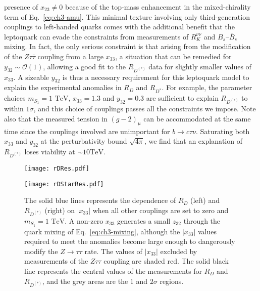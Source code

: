 presence of $x_{23} \neq 0$ because of the top-mass enhancement in the
mixed-chirality term of Eq.~\eqref{eq:ch3-amu}. This minimal texture involving only
third-generation couplings to left-handed quarks comes with the additional
benefit that the leptoquark can evade the constraints from measurements of
$R_K^{\nu\nu}$ and $B_s$--$\bar{B}_s$ mixing. In fact, the only serious
constraint is that arising from the modification of the $Z\tau\bar{\tau}$
coupling from a large $x_{33}$, a situation that can be remedied for $y_{32}
\sim \mathscr{O}(1)$, allowing a good fit to the $R_{D^{(*)}}$ data for slightly
smaller values of $x_{33}$. A sizeable $y_{32}$ is thus a necessary requirement
for this leptoquark model to explain the experimental anomalies in $R_D$ and
$R_{D^*}$. For example, the parameter choices $m_{S_{1}} = 1 \text{ TeV}$, $x_{33}
= 1.3$ and $y_{32} = 0.3$ are sufficient to explain $R_{D^{(*)}}$ to within
$1\sigma$, and this choice of couplings passes all the constraints we impose.
Note also that the measured tension in $(g-2)_\mu$ can be accommodated at the
same time since the couplings involved are unimportant for $b \to c \tau \nu$.
Saturating both $x_{33}$ and $y_{32}$ at the perturbativity bound $\sqrt{4\pi}$,
we find that an explanation of $R_{D^{(*)}}$ loses viability at $\sim 10 \text{
  TeV}$.

\begin{figure}[t]
  \centering
  \begin{minipage}[t]{0.45\linewidth}
    \centering \texttt{[image: rDRes.pdf]}
  \end{minipage}
  \hfill
  \begin{minipage}[t]{0.45\linewidth}
    \centering \texttt{[image: rDStarRes.pdf]}
  \end{minipage}
  \caption[The solid blue lines represents the dependence of $R_D$ (left) and
  $R_{D^{(*)}}$ (right) on $|x_{33}|$ when all other couplings are set to zero
  and $m_{S_{1}} = 1 \text{ TeV}$.]{The solid blue lines represents the dependence
    of $R_D$ (left) and $R_{D^{(*)}}$ (right) on $|x_{33}|$ when all other
    couplings are set to zero and $m_{S_{1}} = 1 \text{ TeV}$. A non-zero $x_{33}$
    generates a small $z_{32}$ through the quark mixing of
    Eq.~\eqref{eq:ch3-mixing}, although the $|x_{33}|$ values required to meet the
    anomalies become large enough to dangerously modify the $Z \to \tau\tau$
    rate. The values of $|x_{33}|$ excluded by measurements of the $Z\tau\tau$
    coupling are shaded red. The solid black line represents the central values
    of the measurements for $R_D$ and $R_{D^{(*)}}$, and the grey areas are the
    $1$ and $2\sigma$ regions.}
  \label{fig:ch3-rDRes}
\end{figure}

